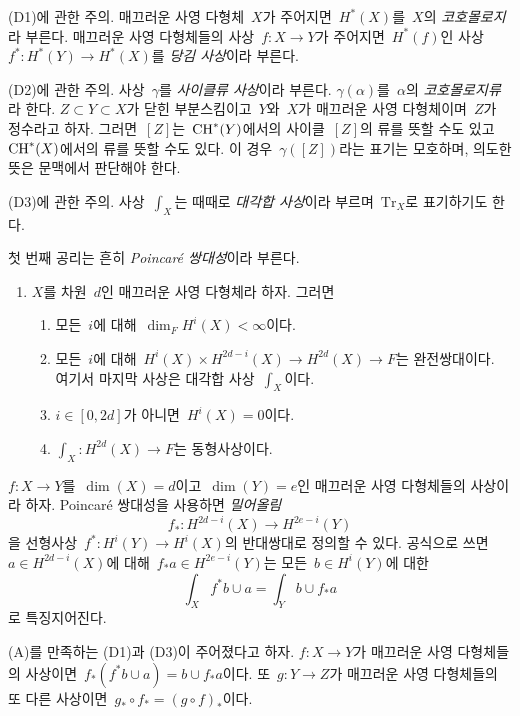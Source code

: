\medskip\noindent
(D1)에 관한 주의. 매끄러운 사영 다형체\  $X$가 주어지면\ 
$H^*(X)$를\  $X$의 {\it 코호몰로지}라 부른다. 매끄러운 사영
다형체들의 사상\  $f : X \to Y$가 주어지면\ 
$H^*(f)$인 사상\  $f^* : H^*(Y) \to H^*(X)$를
{\it 당김 사상}이라 부른다.

\medskip\noindent
(D2)에 관한 주의. 사상\  $\gamma$를 {\it 사이클류 사상}이라 부른다.
$\gamma(\alpha)$를\  $\alpha$의 {\it 코호몰로지류}라 한다.
$Z \subset Y \subset X$가 닫힌 부분스킴이고\  $Y$와\  $X$가 매끄러운
사영 다형체이며\  $Z$가 정수라고 하자. 그러면\  $[Z]$는\ 
$\mathop{\mathrm{CH}}\nolimits^*(Y)$에서의 사이클\  $[Z]$의 류를 뜻할 수도 있고\ 
$\mathop{\mathrm{CH}}\nolimits^*(X)$에서의 류를 뜻할 수도 있다. 이 경우\ 
$\gamma([Z])$라는 표기는 모호하며, 의도한 뜻은 문맥에서 판단해야 한다.

\medskip\noindent
(D3)에 관한 주의. 사상\  $\int_X$는 때때로 {\it 대각합 사상}이라
부르며\  $\text{Tr}_X$로 표기하기도 한다.

\medskip\noindent
첫 번째 공리는 흔히 {\it Poincar\'e 쌍대성}이라 부른다.
\begin{enumerate}
\item[(A)] $X$를 차원\  $d$인 매끄러운 사영 다형체라 하자. 그러면
\begin{enumerate}
\item 모든\  $i$에 대해\  $\dim_F H^i(X) < \infty$이다.
\item 모든\  $i$에 대해\ 
$H^i(X) \times H^{2d - i}(X) \rightarrow H^{2d}(X) \rightarrow F$는
완전쌍대이다. 여기서 마지막 사상은 대각합 사상\  $\int_X$이다.
\item $i \in [0, 2d]$가 아니면\  $H^i(X) = 0$이다.
\item $\int_X : H^{2d}(X) \to F$는 동형사상이다.
\end{enumerate}
\end{enumerate}
$f : X \to Y$를\  $\dim(X) = d$이고\  $\dim(Y) = e$인 매끄러운 사영
다형체들의 사상이라 하자. Poincar\'e 쌍대성을 사용하면 {\it 밀어올림}
$$
f_* : H^{2d - i}(X) \longrightarrow H^{2e - i}(Y)
$$
을 선형사상\  $f^* : H^i(Y) \to H^i(X)$의 반대쌍대로 정의할 수 있다.
공식으로 쓰면\  $a \in H^{2d - i}(X)$에 대해\ 
$f_*a \in H^{2e - i}(Y)$는 모든\  $b \in H^i(Y)$에 대한
$$
\int_X f^*b \cup a = \int_Y b \cup f_*a
$$
로 특징지어진다.

\begin{lemma}
\label{lemma-pushforward-classical}
(A)를 만족하는 (D1)과 (D3)이 주어졌다고 하자.
$f : X \to Y$가 매끄러운 사영 다형체들의 사상이면\ 
$f_*(f^*b \cup a) = b \cup f_*a$이다. 또\ 
$g : Y \to Z$가 매끄러운 사영 다형체들의 또 다른 사상이면\ 
$g_* \circ f_* = (g \circ f)_*$이다.
\end{lemma}


